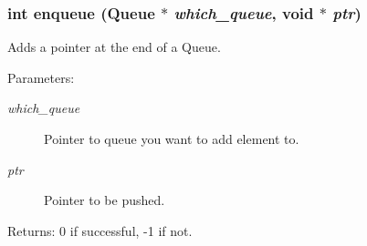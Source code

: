 \subsubsection{\setlength{\rightskip}{0pt plus 5cm}int enqueue (\bf{Queue} $\ast$ {\em which\_\-queue}, void $\ast$ {\em ptr})}\label{queue_8c_1d57a1b76a1967de5c006ed78777e65f}


Adds a pointer at the end of a Queue. \begin{Desc}
\item[Parameters:]
\begin{description}
\item[{\em which\_\-queue}]Pointer to queue you want to add element to. \item[{\em ptr}]Pointer to be pushed. \end{description}
\end{Desc}
\begin{Desc}
\item[Returns:]0 if successful, -1 if not. \end{Desc}
